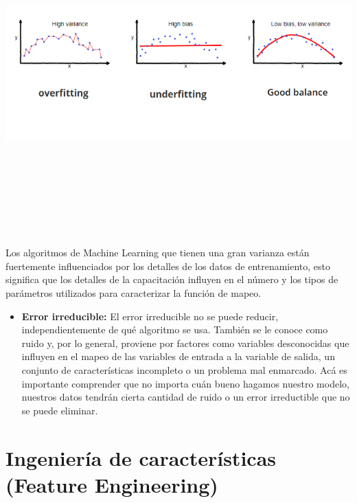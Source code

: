 \documentclass[
]{book}
\providecommand{\tightlist}{%
  \setlength{\itemsep}{0pt}\setlength{\parskip}{0pt}}
\begin{document}
\begin{center}\includegraphics[width=650pt,height=350pt]{img/01-repaso/3-1-3-biasvar} \end{center}

Los algoritmos de Machine Learning que tienen una gran varianza están fuertemente influenciados por los detalles de los datos de entrenamiento, esto significa que los detalles de la capacitación influyen en el número y los tipos de parámetros utilizados para caracterizar la función de mapeo.

\begin{itemize}
\tightlist
\item
  \textbf{Error irreducible:}
  El error irreducible no se puede reducir, independientemente de qué algoritmo se usa. También se le conoce como ruido y, por lo general, proviene por factores como variables desconocidas que influyen en el mapeo de las variables de entrada a la variable de salida, un conjunto de características incompleto o un problema mal enmarcado. Acá es importante comprender que no importa cuán bueno hagamos nuestro modelo, nuestros datos tendrán cierta cantidad de ruido o un error irreductible que no se puede eliminar.
\end{itemize}

\hypertarget{ingenieruxeda-de-caracteruxedsticas-feature-engineering}{%
\section{Ingeniería de características (Feature Engineering)}\label{ingenieruxeda-de-caracteruxedsticas-feature-engineering}}
\end{document}
